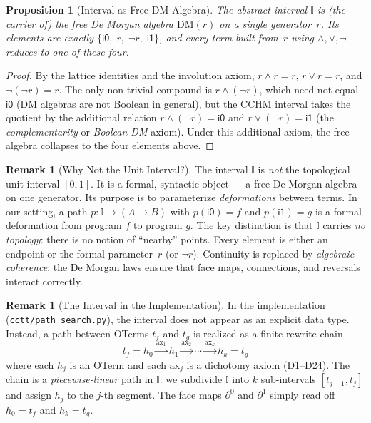 \documentclass[11pt,a4paper]{report}
\theoremstyle{definition}
\newtheorem{remark}[definition]{Remark}
\theoremstyle{plain}
\newtheorem{proposition}[definition]{Proposition}
\newcommand{\interval}{\mathbb{I}}
\begin{document}
\begin{proposition}[Interval as Free DM Algebra]
\label{prop:interval-free}
The abstract interval $\interval$ is (the carrier of) the free
De Morgan algebra $\mathrm{DM}(r)$ on a single generator~$r$.
Its elements are exactly
$\{\mathsf{i0},\; r,\; \lnot r,\; \mathsf{i1}\}$,
and every term built from~$r$ using $\land, \lor, \lnot$ reduces to
one of these four.
\end{proposition}

\begin{proof}
By the lattice identities and the involution axiom, $r \land r = r$,
$r \lor r = r$, and $\lnot(\lnot r) = r$.  The only non-trivial
compound is $r \land (\lnot r)$, which need not equal $\mathsf{i0}$
(DM algebras are not Boolean in general), but the CCHM interval
takes the quotient by the additional relation
$r \land (\lnot r) = \mathsf{i0}$ and $r \lor (\lnot r) = \mathsf{i1}$
(the \emph{complementarity} or \emph{Boolean DM} axiom).  Under this
additional axiom, the free algebra collapses to the four elements above.
\end{proof}

\begin{remark}[Why Not the Unit Interval?]
The interval $\interval$ is \emph{not} the topological unit interval
$[0,1]$.  It is a formal, syntactic object --- a free De Morgan algebra
on one generator.  Its purpose is to parameterize \emph{deformations}
between terms.  In our setting, a path $p : \interval \to (A \to B)$
with $p(\mathsf{i0}) = f$ and $p(\mathsf{i1}) = g$ is a formal
deformation from program $f$ to program $g$.
The key distinction is that $\interval$ carries \emph{no topology}:
there is no notion of ``nearby'' points.  Every element is either an
endpoint or the formal parameter~$r$ (or $\lnot r$).  Continuity is
replaced by \emph{algebraic coherence}: the De Morgan laws ensure that
face maps, connections, and reversals interact correctly.
\end{remark}

\begin{remark}[The Interval in the Implementation]
\label{rem:interval-impl}
In the implementation (\texttt{cctt/path\_search.py}), the interval
does not appear as an explicit data type.  Instead, a path between
OTerms $t_f$ and $t_g$ is realized as a finite rewrite chain
\[
  t_f = h_0 \xrightarrow{\text{ax}_1} h_1 \xrightarrow{\text{ax}_2}
  \cdots \xrightarrow{\text{ax}_k} h_k = t_g
\]
where each $h_j$ is an OTerm and each $\text{ax}_j$ is a dichotomy
axiom (D1--D24).  The chain is a \emph{piecewise-linear} path in
$\interval$: we subdivide $\interval$ into $k$ sub-intervals
$[t_{j-1}, t_j]$ and assign $h_j$ to the $j$-th segment.  The face
maps $\partial^0$ and $\partial^1$ simply read off
$h_0 = t_f$ and $h_k = t_g$.
\end{remark}
\end{document}
